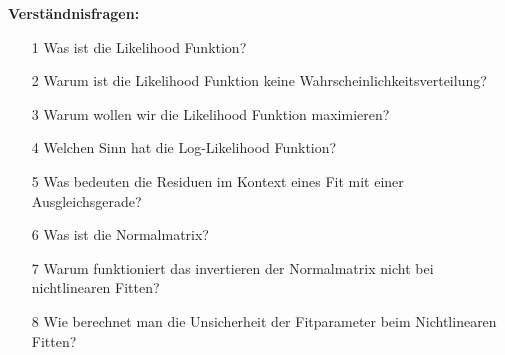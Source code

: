 \newpage

\begin{tcolorbox}[enhanced,width=6in,
    fontupper=\small,drop fuzzy shadow southwest,
    colframe=black!50!black,colback=black!5]
\textbf{Verständnisfragen:} \\
\begin{enumerate}
\item[1] Was ist die Likelihood Funktion?
\item[2] Warum ist die Likelihood Funktion keine Wahrscheinlichkeitsverteilung? 
\item[3] Warum wollen wir die Likelihood Funktion maximieren? 
\item[4] Welchen Sinn hat die Log-Likelihood Funktion? 
\item[5] Was bedeuten die Residuen im Kontext eines Fit mit einer Ausgleichsgerade? 
\item[6] Was ist die Normalmatrix? 
\item[7] Warum funktioniert das invertieren der Normalmatrix nicht bei nichtlinearen Fitten? 
\item[8] Wie berechnet man die Unsicherheit der Fitparameter beim Nichtlinearen Fitten? 
\end{enumerate}
\end{tcolorbox}

